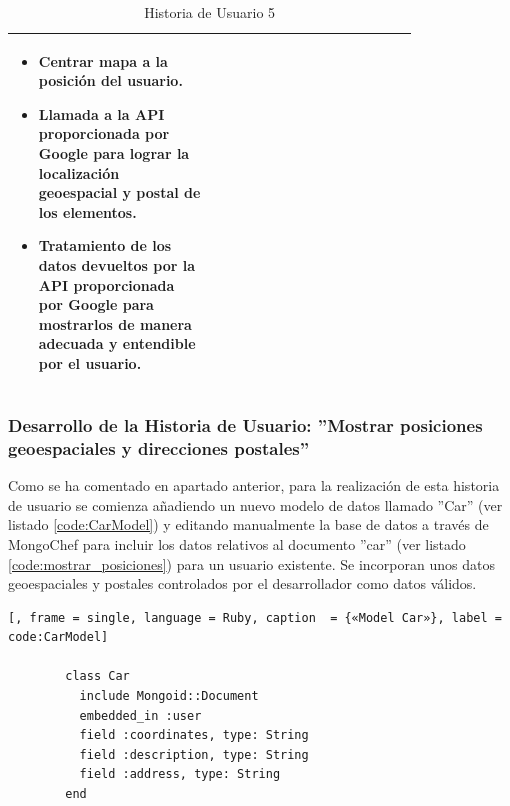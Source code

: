 \begin{table}[H]
\begin{tabular}{p{0.4\linewidth}p{0.4\linewidth}}
{\begin{minipage}{12cm}
\begin{itemize}
	    			\item Centrar mapa a la posición del usuario.
	    			\item Llamada a la API proporcionada por Google para lograr la localización geoespacial y postal de los elementos.
	    			\item Tratamiento de los datos devueltos por la API proporcionada por Google para mostrarlos de manera adecuada y entendible por el usuario.
				\end{itemize}
			  	\vskip 4pt
		 	\end{minipage}
		} \\																				
	    \hline
	  \end{tabular}
	  \caption{Historia de Usuario 5}
	\end{table}
		
	\subsubsection{Desarrollo de la Historia de Usuario: ''Mostrar posiciones geoespaciales y direcciones postales''}
	Como se ha comentado en apartado anterior, para la realización de esta historia de usuario se comienza añadiendo un nuevo modelo de datos llamado ''Car'' (ver listado \ref{code:CarModel}) y editando manualmente la base de datos a través de MongoChef para incluir los datos relativos al documento ''car'' (ver listado \ref{code:mostrar_posiciones}) para un usuario existente. Se incorporan unos datos geoespaciales y postales controlados por el desarrollador como datos válidos.
	
	\begin{lstlisting}[, frame = single, language = Ruby, caption  = {«Model Car»}, label = code:CarModel]
		
		class Car
		  include Mongoid::Document
		  embedded_in :user
		  field :coordinates, type: String
		  field :description, type: String
		  field :address, type: String
		end
		
	\end{lstlisting}

